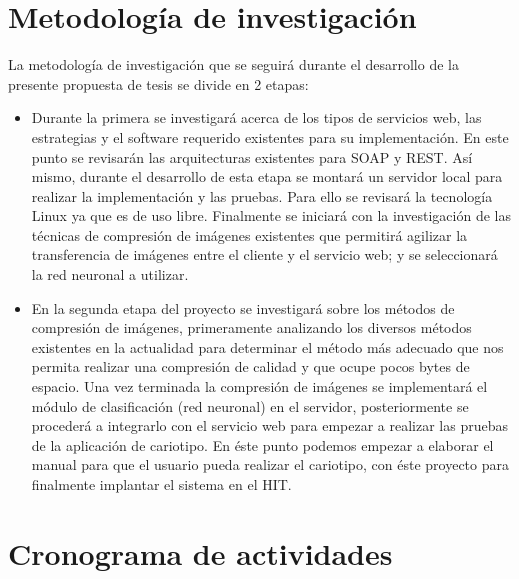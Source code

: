 \documentclass[12pt,letterpaper,titlepage]{article}
\begin{document}
\begin{itemize}
\section{Metodología de investigación}\label{metodo}

La metodología de investigación que se seguirá durante el desarrollo de la presente propuesta de tesis se divide en 2 etapas:

\begin{itemize}
\item Durante la primera se investigará acerca de los tipos de servicios web, las estrategias y el software requerido existentes para su implementación. En este punto se revisarán las arquitecturas existentes para SOAP y REST. Así mismo, durante el desarrollo de esta etapa se montará un servidor local para realizar la implementación y las pruebas. Para ello se revisará la tecnología Linux ya que es de uso libre. Finalmente se iniciará con la investigación de las técnicas de compresión de imágenes existentes que permitirá agilizar la transferencia de imágenes entre el cliente y el servicio web; y se seleccionará la red neuronal a utilizar.\\

\item En la segunda etapa del proyecto se investigará sobre los métodos de compresión de imágenes, primeramente analizando los diversos métodos  existentes en la actualidad para determinar el método más adecuado que nos permita realizar una compresión de calidad y que ocupe pocos bytes de espacio. Una vez terminada la compresión de imágenes se implementará el módulo de clasificación (red neuronal) en el servidor, posteriormente se procederá a integrarlo con el servicio web para empezar a realizar las pruebas de la aplicación de cariotipo. En éste punto podemos empezar a elaborar el manual para que el usuario pueda realizar el cariotipo, con éste proyecto para finalmente implantar el sistema en el HIT.\\

\end{itemize}



\section{Cronograma de actividades}\label{cronograma}




\end{itemize}
\end{document}
